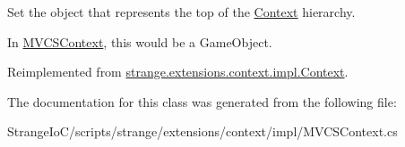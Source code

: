 Set the object that represents the top of the \hyperlink{classstrange_1_1extensions_1_1context_1_1impl_1_1_context}{Context} hierarchy. 

In \hyperlink{classstrange_1_1extensions_1_1context_1_1impl_1_1_m_v_c_s_context}{M\-V\-C\-S\-Context}, this would be a Game\-Object. 

Reimplemented from \hyperlink{classstrange_1_1extensions_1_1context_1_1impl_1_1_context_a376f83ac4bf2233eedbc760f1aeddccd}{strange.\-extensions.\-context.\-impl.\-Context}.



The documentation for this class was generated from the following file\-:\begin{DoxyCompactItemize}
\item 
Strange\-Io\-C/scripts/strange/extensions/context/impl/M\-V\-C\-S\-Context.\-cs\end{DoxyCompactItemize}
